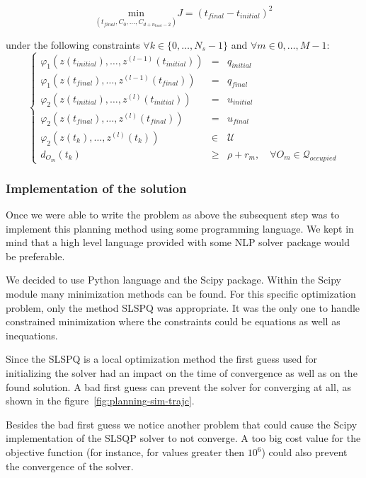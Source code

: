 \begin{equation}\label{eq:objective}
	\underset{(t_{final},C_0,\dotsc,C_{d+n_{knot}-2})}{\mathrm{min}} J = (t_{final}-t_{initial})^{2}
\end{equation}

under the following constraints $\forall k \in \{0,\dotsc,N_s -1\}$ and $\forall m \in {0,\dotsc,M-1}$:
\begin{equation}%
\left\lbrace\begin{array}{lcl}
    \varphi_1(z(t_{initial}),\dotsc,z^{(l-1)}(t_{initial})) & = & q_{initial}\\
    \varphi_1(z(t_{final}),\dotsc,z^{(l-1)}(t_{final})) & = & q_{final}\\
    \varphi_2(z(t_{initial}),\dotsc,z^{(l)}(t_{initial})) & = & u_{initial}\\
    \varphi_2(z(t_{final}),\dotsc,z^{(l)}(t_{final}))& = & u_{final}\\
    \varphi_2(z(t_k),\dotsc,z^{(l)}(t_k)) &\in& \mathcal{U}\\
    d_{O_m}(t_k) &\geq& \rho + r_m,\quad \forall O_m \in \mathcal{Q}_{occupied}
\end{array}\right.
\end{equation}

\subsubsection{Implementation of the solution}

Once we were able to write the problem as above the subsequent step was to implement this planning method using some programming language. We kept in mind that a high level language provided with some NLP solver package would be preferable.

We decided to use Python language and the Scipy package. Within the Scipy module many minimization methods can be found. For this specific optimization problem, only the method SLSPQ was appropriate. It was the only one to handle constrained minimization where the constraints could be equations as well as inequations.

Since the SLSPQ is a local optimization method the first guess used for initializing the solver had an impact on the time of convergence as well as on the found solution. A bad first guess can prevent the solver for converging at all, as shown in the figure~\ref{fig:planning-sim-trajc}.

Besides the bad first guess we notice another problem that could cause the Scipy implementation of the SLSQP solver to not converge. A too big cost value for the objective function (for instance, for values greater then $10^6$) could also prevent the convergence of the solver.

